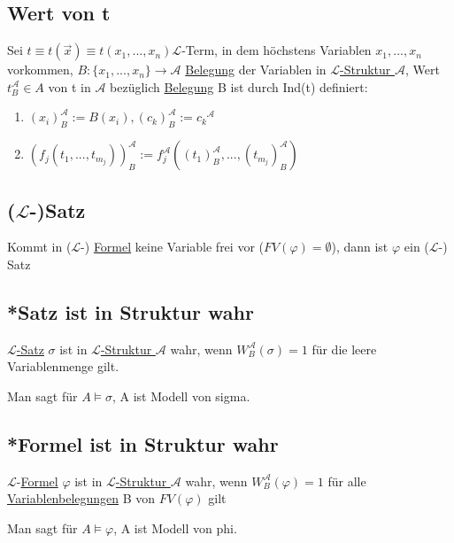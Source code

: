 \documentclass[12pt,a4paper]{article} %
\begin{document}
	\subsection{Wert von t}
	Sei $t \equiv t(\overrightarrow{x}) \equiv t(x_1, ..., x_n) \hyperref[Term]{\mathcal{L}}$-Term, in dem höchstens Variablen $x_1, ..., x_n$ vorkommen, $B: \{x_1, ..., x_n\} \rightarrow \mathcal{A}$ \hyperref[Belegung]{Belegung} der Variablen in \hyperref[Struktur]{$\mathcal{L}$-Struktur $\mathcal{A}$}, Wert $t_B^{\mathcal{A}} \in A$ von t in $\mathcal{A}$ bezüglich \hyperref[Belegung]{Belegung} B ist durch Ind(t) definiert: 
	\begin{enumerate}
		\item $(x_i)_B^{\mathcal{A}} := B(x_i), (c_k)_B^{\mathcal{A}} := {c_k}^{\mathcal{A}}$
		\item $(f_j(t_1, ..., t_{m_j}))_B^{\mathcal{A}} := f_j^{\mathcal{A}}((t_1)_B^{\mathcal{A}}, ..., (t_{m_j})_B^{\mathcal{A}})$
	\end{enumerate}

	\subsection{($\mathcal{L}$-)Satz}
	\label{LSatz}
	Kommt in ($\mathcal{L}$-) \hyperref[Formel]{Formel} keine Variable frei vor ($FV(\varphi) = \emptyset$), dann ist $\varphi$ ein ($\mathcal{L}$-) Satz
	
	\subsection{*Satz ist in Struktur wahr}
	\hyperref[LSatz]{$\mathcal{L}$-Satz} $\sigma$ ist in \hyperref[Struktur]{$\mathcal{L}$-Struktur $\mathcal{A}$} wahr, wenn $W_B^{\mathcal{A}}(\sigma) = 1$ für die leere Variablenmenge gilt.
	
	Man sagt für $A \hyperref[Erfullbar]{\vDash} \sigma$, A ist Modell von sigma.
	
	\subsection{*Formel ist in Struktur wahr}
	$\mathcal{L}$-\hyperref[Formel]{Formel} $\varphi$ ist in \hyperref[Struktur]{$\mathcal{L}$-Struktur $\mathcal{A}$} wahr, wenn $W_B^{\mathcal{A}}(\varphi) = 1$ für alle \hyperref[Belegung]{Variablenbelegungen} B von $FV(\varphi)$ gilt
	
	Man sagt für $A \hyperref[Erfullbar]{\vDash} \varphi$, A ist Modell von phi.
	
\end{document}
